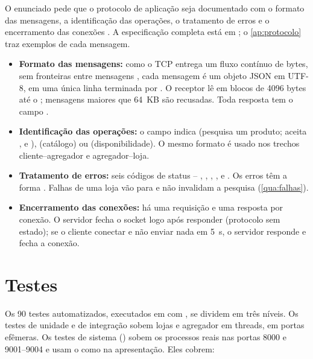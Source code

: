 O enunciado pede que o protocolo de aplicação seja documentado com o formato das mensagens, a identificação das operações, o tratamento de erros e o encerramento das conexões \cite{enunciado2026}. A especificação completa está em ; o \autoref{ap:protocolo} traz exemplos de cada mensagem.

\begin{itemize}
  \item \textbf{Formato das mensagens:} como o TCP entrega um fluxo contínuo de bytes, sem fronteiras entre mensagens \cite{kurose2021}, cada mensagem é um objeto JSON em UTF-8, em uma única linha terminada por . O receptor lê em blocos de 4096 bytes até o ; mensagens maiores que 64~KB são recusadas. Toda resposta tem o campo .
  \item \textbf{Identificação das operações:} o campo  indica  (pesquisa um produto; aceita ,  e ),  (catálogo) ou  (disponibilidade). O mesmo formato é usado nos trechos cliente--agregador e agregador--loja.
  \item \textbf{Tratamento de erros:} seis códigos de status -- , , , ,  e . Os erros têm a forma . Falhas de uma loja vão para  e não invalidam a pesquisa (\autoref{qua:falhas}).
  \item \textbf{Encerramento das conexões:} há uma requisição e uma resposta por conexão. O servidor fecha o socket logo após responder (protocolo sem estado); se o cliente conectar e não enviar nada em 5~s, o servidor responde  e fecha a conexão.
\end{itemize}

\section{Testes}

Os 90 testes automatizados, executados em  com , se dividem em três níveis. Os testes de unidade e de integração sobem lojas e agregador em threads, em portas efêmeras. Os testes de sistema () sobem os processos reais nas portas 8000 e 9001--9004 e usam o  como na apresentação. Eles cobrem:

